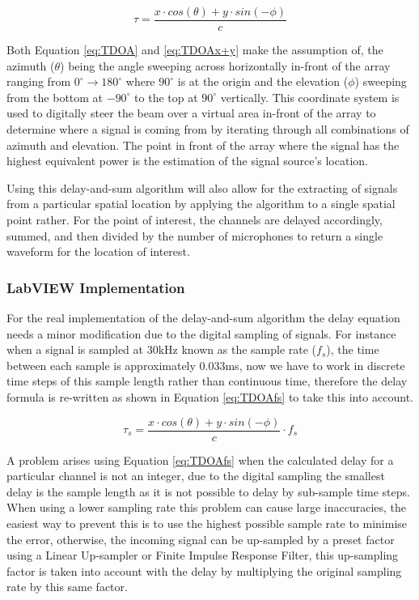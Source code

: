 \documentclass{UoNMCHA}
\numberwithin{equation}{section}
\begin{document}
    \begin{equation}
        \tau = \frac{x \cdot cos(\theta) + y \cdot sin(-\phi)}{c}
        \label{eq:TDOAx+y}
    \end{equation}
    
    Both Equation \ref{eq:TDOA} and \ref{eq:TDOAx+y} make the assumption of, the azimuth ($\theta$) being the angle sweeping across horizontally in-front of the array ranging from $0^{\circ} \to 180^{\circ}$ where $90^{\circ}$ is at the origin and the elevation ($\phi$) sweeping from the bottom at $-90^{\circ}$ to the top at $90^{\circ}$ vertically. This coordinate system is used to digitally steer the beam over a virtual area in-front of the array to determine where a signal is coming from by iterating through all combinations of azimuth and elevation. The point in front of the array where the signal has the highest equivalent power is the estimation of the signal source's location.
    
    Using this delay-and-sum algorithm will also allow for the extracting of signals from a particular spatial location by applying the algorithm to a single spatial point rather. For the point of interest, the channels are delayed accordingly, summed, and then divided by the number of microphones to return a single waveform for the location of interest.
\subsubsection{LabVIEW Implementation} \label{sec:DAS Implementation}
    For the real implementation of the delay-and-sum algorithm the delay equation needs a minor modification due to the digital sampling of signals. For instance when a signal is sampled at $30$kHz known as the sample rate ($f_s$), the time between each sample is approximately $0.033$ms, now we have to work in discrete time steps of this sample length rather than continuous time, therefore the delay formula is re-written as shown in Equation \ref{eq:TDOAfs} to take this into account.
    
    \begin{equation}
        \tau_s = \frac{x \cdot cos(\theta) + y \cdot sin(-\phi)}{c}\cdot f_s
        \label{eq:TDOAfs}
    \end{equation}
    
    A problem arises using Equation \ref{eq:TDOAfs} when the calculated delay for a particular channel is not an integer, due to the digital sampling the smallest delay is the sample length as it is not possible to delay by sub-sample time steps. When using a lower sampling rate this problem can cause large inaccuracies, the easiest way to prevent this is to use the highest possible sample rate to minimise the error, otherwise, the incoming signal can be up-sampled by a preset factor using a Linear Up-sampler or Finite Impulse Response Filter, this up-sampling factor is taken into account with the delay by multiplying the original sampling rate by this same factor. 
    
\end{document}
